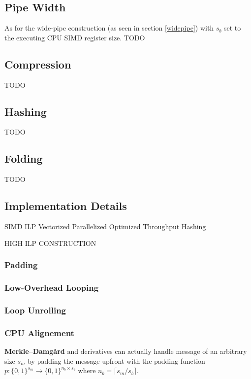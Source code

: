 \documentclass[11pt]{article}
\begin{document}
\subsection{Pipe Width}
As for the wide-pipe construction (as seen in section \ref{widepipe}) with \( s_b \) set to the executing CPU SIMD register size.
TODO

\subsection{Compression}

TODO

\subsection{Hashing}

TODO

\subsection{Folding}

TODO

\subsection{Implementation Details}

SIMD
ILP
Vectorized
Parallelized
Optimized
Throughput
Hashing

HIGH ILP CONSTRUCTION

\subsubsection{Padding}

\subsubsection{Low-Overhead Looping}

\subsubsection{Loop Unrolling}

\subsubsection{CPU Alignement}

\textbf{Merkle–Damgård} and derivatives can actually handle message of an arbitrary size \( s_m \) by padding the message upfront with the padding function \( p: \{0,1\}^{s_m} \to \{0,1\}^{n_b \times s_b} \) where \( n_b = \lceil s_m/s_b \rceil \).
\end{document}
